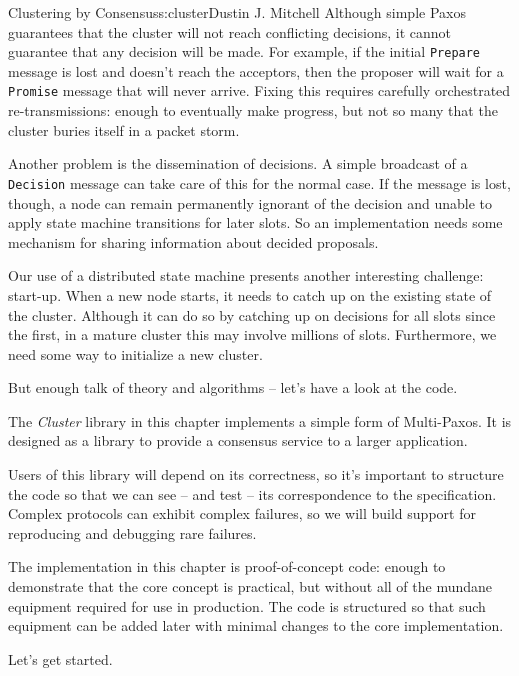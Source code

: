 \begin{aosachapter}{Clustering by Consensus}{s:cluster}{Dustin J. Mitchell}
Although simple Paxos guarantees that the cluster will not reach
conflicting decisions, it cannot guarantee that any decision will be
made. For example, if the initial \texttt{Prepare} message is lost and
doesn't reach the acceptors, then the proposer will wait for a
\texttt{Promise} message that will never arrive. Fixing this requires
carefully orchestrated re-transmissions: enough to eventually make
progress, but not so many that the cluster buries itself in a packet
storm.

Another problem is the dissemination of decisions. A simple broadcast of
a \texttt{Decision} message can take care of this for the normal case.
If the message is lost, though, a node can remain permanently ignorant
of the decision and unable to apply state machine transitions for later
slots. So an implementation needs some mechanism for sharing information
about decided proposals.

Our use of a distributed state machine presents another interesting
challenge: start-up. When a new node starts, it needs to catch up on the
existing state of the cluster. Although it can do so by catching up on
decisions for all slots since the first, in a mature cluster this may
involve millions of slots. Furthermore, we need some way to initialize a
new cluster.

But enough talk of theory and algorithms -- let's have a look at the
code.

\label{introducing-cluster}

The \emph{Cluster} library in this chapter implements a simple form of
Multi-Paxos. It is designed as a library to provide a consensus service
to a larger application.

Users of this library will depend on its correctness, so it's important
to structure the code so that we can see -- and test -- its
correspondence to the specification. Complex protocols can exhibit
complex failures, so we will build support for reproducing and debugging
rare failures.

The implementation in this chapter is proof-of-concept code: enough to
demonstrate that the core concept is practical, but without all of the
mundane equipment required for use in production. The code is structured
so that such equipment can be added later with minimal changes to the
core implementation.

Let's get started.

\label{types-and-constants}


\end{aosachapter}
